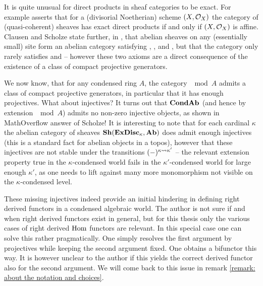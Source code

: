 \begin{remark}
	It is quite unusual for direct products in sheaf categories to be exact. For example \cite[Theorem 1.1]{exactness-direct-products} asserts that for a (divisorial Noetherian) scheme $(X, {{\mathcal{O}}_{X}})$ the category of (quasi-coherent) sheaves has exact direct products if and only if $(X, {{\mathcal{O}}_{X}})$ is affine. Clausen and Scholze state further, in \cite[Remark 1.11]{condenseddotpdf}, that abelian sheaves on any (essentially small) site form an abelian category satisfying , ,  and , but that the category only rarely satisfies  and  -- however these two axioms are a direct consequence of the existence of a class of compact projective generators.
\end{remark}

\begin{remark}
	\label{remark: not enough injectives}
	
	We now know, that for any condensed ring $A$, the category $\mod{A}$ admits a class of compact projective generators, in particular that it has enough projectives. What about injectives? It turns out that ${{{\mathbf{Cond}}}{{\mathbf{Ab}}}}$ (and hence by extension $\mod{A}$) admits no non-zero injective objects, as shown in \cite[\href{https://mathoverflow.net/a/356261/546808}{this}]{injectives} MathOverflow answer of Scholze! It is interesting to note that for each cardinal $\kappa$ the abelian category of sheaves $\Sheaves{\boundedExtremallyDisconnectedSets{\kappa}}{\Ab}$ does admit enough injectives (this is a standard fact for abelian objects in a topos), however that these injectives are not stable under the transitions $(-)^{\kappa\rightsquigarrow \kappa'}$ -- the relevant extension property true in the $\kappa$-condensed world fails in the $\kappa'$-condensed world for large enough $\kappa'$, as one needs to lift against many more monomorphism not visible on the $\kappa$-condensed level.
	
	These missing injectives indeed provide an initial hindering in defining right derived functors in a condensed algebraic world. The author is not sure if and when right derived functors exist in general, but for this thesis only the various cases of right derived ${\operatorname{Hom}}$ functors are relevant. In this special case one can solve this rather pragmatically. One simply resolves the first argument by projectives while keeping the second argument fixed. One obtains a bifunctor this way. It is however unclear to the author if this yields the correct derived functor also for the second argument. We will come back to this issue in remark \ref{remark: about the notation and choices}.
\end{remark}

